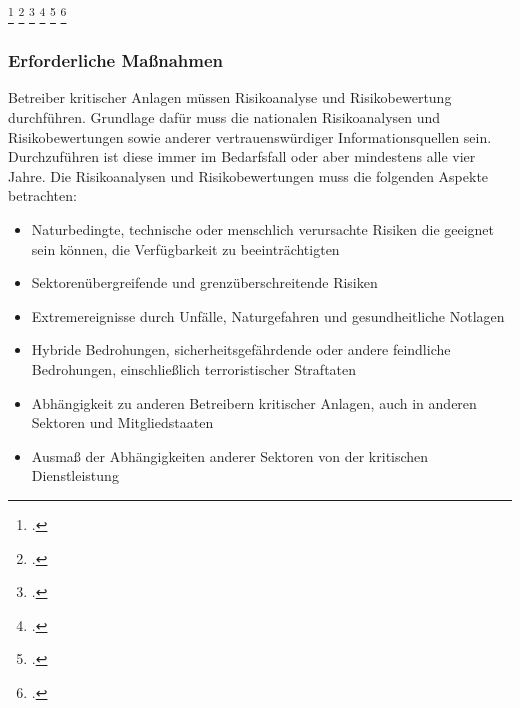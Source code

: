 \documentclass[11pt,a4paper,hidelinks]{article}   %
\begin{document}
{                    \footcite[Vgl. §2,][]{KRITIS-DachG}
                    \footcite[Vgl. §3, Absatz 1,][]{KRITIS-DachG}
                    \footcite[Vgl. §4, Absatz 1,][]{KRITIS-DachG}
                    \footcite[Vgl. §46, Absatz 1,][]{KRITIS-DachG}
                    \footcite[Vgl. §18, Absatz 1,][]{KRITIS-DachG}
                    \footcite[Vgl. §16, Absatz 1,][]{KRITIS-DachG}
                }
                \subsubsection{Erforderliche Maßnahmen}
                Betreiber kritischer Anlagen müssen Risikoanalyse und Risikobewertung durchführen. Grundlage dafür muss die nationalen Risikoanalysen und Risikobewertungen sowie anderer vertrauenswürdiger Informationsquellen sein. Durchzuführen ist diese immer im Bedarfsfall oder aber mindestens alle vier Jahre. Die Risikoanalysen und Risikobewertungen muss die folgenden Aspekte betrachten:
                \begin{itemize}
                    \item Naturbedingte, technische oder menschlich verursachte Risiken die geeignet sein können, die Verfügbarkeit zu beeinträchtigten
                    \item Sektorenübergreifende und grenzüberschreitende Risiken
                    \item Extremereignisse durch Unfälle, Naturgefahren und gesundheitliche Notlagen
                    \item Hybride Bedrohungen, sicherheitsgefährdende oder andere feindliche Bedrohungen, einschließlich terroristischer Straftaten
                    \item Abhängigkeit zu anderen Betreibern kritischer Anlagen, auch in anderen Sektoren und Mitgliedstaaten
                    \item Ausmaß der Abhängigkeiten anderer Sektoren von der kritischen Dienstleistung
                \end{itemize}
\end{document}
